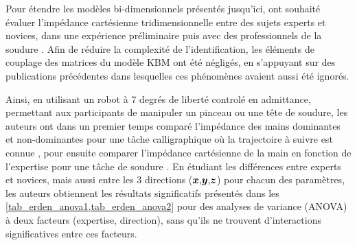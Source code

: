 %


Pour étendre les modèles bi-dimensionnels présentés jusqu'ici, \textcite{erden_end-point_2015} ont souhaité évaluer l'impédance cartésienne tridimensionnelle entre des sujets experts et novices, dans une expérience préliminaire puis avec des professionnels de la soudure \parencite{erden_hand_2015}. Afin de réduire la complexité de l'identification, les éléments de couplage des matrices du modèle KBM ont été négligés, en s'appuyant sur des publications précédentes \parencite{tsuji_analysis_2004, fu_human-arm-and-hand-dynamic_2012} dans lesquelles ces phénomènes avaient aussi été ignorés. 

Ainsi, en utilisant un robot à 7 degrés de liberté controlé en admittance, permettant aux participants de manipuler un pinceau ou une tête de soudure, les auteurs ont dans un premier temps comparé l'impédance des mains dominantes et non-dominantes pour une tâche calligraphique où la trajectoire à suivre est connue \parencite{erden_end-point_2015}, pour ensuite comparer l'impédance cartésienne de la main en fonction de l'expertise pour une tâche de soudure \parencite{erden_hand_2015}. En étudiant les différences entre experts et novices, mais aussi entre les 3 directions ($\vect{x}\text{,} \vect{y}\text{,} \vect{z}$) pour chacun des paramètres, les auteurs obtiennent les résultats significatifs présentés dans les \cref{tab_erden_anova1,tab_erden_anova2} pour des analyses de variance (ANOVA) à deux facteurs (expertise, direction), sans qu'ils ne trouvent d'interactions significatives entre ces facteurs.

